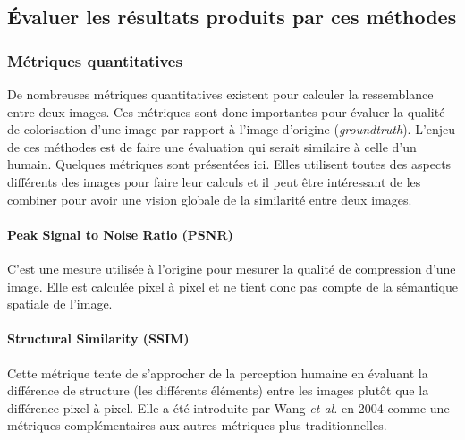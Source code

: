 \documentclass{article}
\begin{document}

\subsection{Évaluer les résultats produits par ces méthodes}

\subsubsection{Métriques quantitatives}

De nombreuses métriques quantitatives existent pour calculer la ressemblance entre deux images. Ces métriques sont donc importantes pour évaluer
la qualité de colorisation d'une image par rapport à l'image d'origine (\textit{groundtruth}).
L'enjeu de ces méthodes est de faire une évaluation qui serait similaire à celle d'un humain.
Quelques métriques sont présentées ici. Elles utilisent toutes des aspects différents des images pour faire leur calculs
et il peut être intéressant de les combiner pour avoir une vision globale de la similarité entre deux images.

\paragraph{Peak Signal to Noise Ratio (PSNR)}
C'est une mesure utilisée à l'origine pour mesurer la qualité de compression d'une image.
Elle est calculée pixel à pixel et ne tient donc pas compte de la sémantique spatiale de l'image.

\paragraph{Structural Similarity (SSIM)}
Cette métrique tente de s'approcher de la perception humaine en évaluant la différence de structure (les différents éléments) entre les images plutôt que la différence pixel à pixel.
Elle a été introduite par Wang \textit{et al.} \cite{1284395} en 2004 comme une métriques complémentaires aux autres métriques plus traditionnelles.
\end{document}
